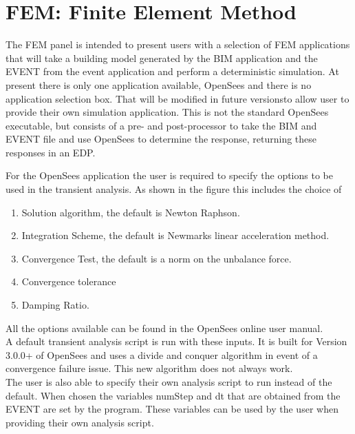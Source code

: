 


\section{FEM: Finite Element Method}
The FEM panel is intended to present users with a selection of FEM applications that will take a building model generated by the BIM application and the EVENT from the event application and perform a deterministic simulation. 
At present there is only one application available, OpenSees and there is no application selection box.  That will be modified in future versionsto allow user to provide their own simulation application.  This is not the standard OpenSees executable, but consists of a pre- and post-processor to take the  BIM and EVENT file and use OpenSees to determine the response, returning these responses in an EDP. 

For the OpenSees application the user is required to specify the options to be used in the transient analysis. As shown in the figure this includes the choice of 
\begin{enumerate}
\item Solution algorithm, the default is Newton Raphson.
\item Integration Scheme, the default is Newmarks linear acceleration method.
\item Convergence Test, the default is a norm on the unbalance force.
\item Convergence tolerance
\item Damping Ratio.
\end{enumerate}

All the options available can be found in the OpenSees online user manual.\\

A default transient analysis script is run with these inputs. It is built for Version 3.0.0+ of OpenSees and uses a divide and conquer  algorithm in event of a convergence failure issue. This new algorithm does not always work. \\

The user is also able to specify their 
own analysis script to run instead of the default. When chosen the variables numStep and dt that are obtained from the EVENT are set by the program. These variables can be used by the user when providing their own analysis script.

